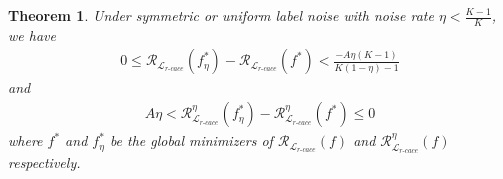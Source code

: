 \documentclass{article}
\newtheorem{theorem}{Theorem}
\begin{document}
\begin{theorem}
	Under symmetric or uniform label noise with noise rate $\eta < \frac{K-1}{K}$, we have  
	\begin{align}
		0\le \mathcal{R}_{\mathcal{L}_{r\textrm{-}cace}}(f^{*}_{\eta}) - \mathcal{R}_{\mathcal{L}_{r\textrm{-}cace}}(f^{*}) \nonumber < \frac{-A\eta (K-1)}{K(1-\eta)-1} \nonumber
	\end{align}
	and 
	\begin{align}
		A\eta<\mathcal{R}^{\eta}_{\mathcal{L}_{r\textrm{-}cace}}(f^{*}_{\eta}) - \mathcal{R}^{\eta}_{\mathcal{L}_{r\textrm{-}cace}}(f^{*}) \le 0 \nonumber
	\end{align}
	where $f^{*}$ and $f^{*}_{\eta}$ be the global minimizers of $\mathcal{R}_{\mathcal{L}_{r\textrm{-}cace}}(f)$ and $\mathcal{R}^{\eta}_{\mathcal{L}_{r\textrm{-}cace}}(f)$ respectively.
\end{theorem}
\end{document}
